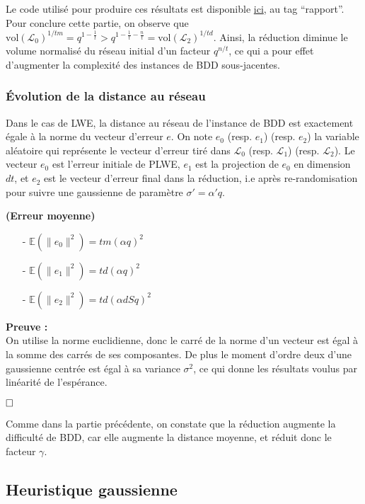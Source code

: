 \documentclass[11pt,a4paper]{article}
\begin{document}
Le code utilisé pour produire ces résultats est disponible \href{https://github.com/Hazdard/mplwe-sage/tree/main}{ici}, au tag ``rapport''. \\

Pour conclure cette partie, on observe que $\text{vol}(\mathcal{L}_0)^{1/tm}=q^{1-\frac{1}{t}} > q^{1-\frac{1}{t}-\frac{n}{t}}=\text{vol}(\mathcal{L}_2)^{1/td}$. Ainsi, la réduction diminue le volume normalisé du réseau initial d'un facteur $q^{n/t}$, ce qui a pour effet d'augmenter la complexité des instances de BDD sous-jacentes.
\subsubsection{Évolution de la distance au réseau}

Dans le cas de LWE, la distance au réseau de l'instance de BDD est exactement égale à la norme du vecteur d'erreur $e$. On note $e_0$ (resp. $e_1$) (resp. $e_2$) la variable aléatoire qui représente le vecteur d'erreur tiré dans $\mathcal{L}_0$ (resp. $\mathcal{L}_1$) (resp. $\mathcal{L}_2$). Le vecteur $e_0$ est l'erreur initiale de PLWE, $e_1$ est la projection de $e_0$ en dimension $dt$, et $e_2$ est le vecteur d'erreur final dans la réduction, i.e après re-randomisation pour suivre une gaussienne de paramètre $\sigma' = \alpha' q$.
\begin{theorem}\textbf{(Erreur moyenne)}
\begin{itemize}
\item[-] $\mathbb{E}(\|e_0\|^2) = tm(\alpha q)^2 $
\item[-] $\mathbb{E}(\|e_1\|^2) = td(\alpha q)^2 $
\item[-] $\mathbb{E}(\|e_2\|^2) = td(\alpha d S q)^2$
\end{itemize}
\end{theorem}
\textbf{Preuve :} \\
On utilise la norme euclidienne, donc le carré de la norme d'un vecteur est égal à la somme des carrés de ses composantes. De plus le moment d'ordre deux d'une gaussienne centrée est égal à sa variance $\sigma^2$, ce qui donne les résultats voulus par linéarité de l'espérance.

$\hfill \square$

Comme dans la partie précédente, on constate que la réduction augmente la difficulté de BDD, car elle augmente la distance moyenne, et réduit donc le facteur $\gamma$.

\subsection{Heuristique gaussienne}
\end{document}
